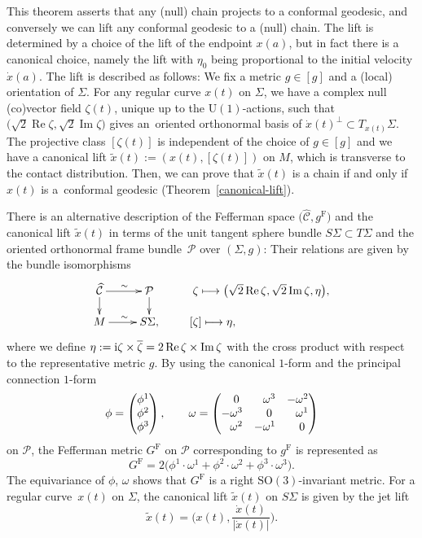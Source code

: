 \documentclass[pdftex]{sigma}
\newcommand\ol{\overline}
\newcommand{\wh}{\widehat}
\numberwithin{equation}{section}
\begin{document}
This theorem asserts that any (null) chain projects to a conformal geodesic, and conversely we can lift any conformal geodesic to a (null) chain. The lift is determined by a choice of the lift of the endpoint $x(a)$, but in fact there is a canonical choice, namely the lift with $\eta_0$ being proportional to the initial velocity $\dot x(a)$. The lift is described as follows:
We fix a metric $g\in[g]$ and a (local) orientation of $\Sigma$. For any regular curve $x(t)$ on $\Sigma$, we have a complex null (co)vector field $\zeta(t)$, unique up to the $\mathrm{U}(1)$-actions, such that $\bigl(\sqrt{2}\operatorname{Re}\zeta, \sqrt{2}\operatorname{Im}\zeta\bigr)$ gives an~oriented orthonormal basis of $\dot x(t)^\perp\subset T_{x(t)}\Sigma$. The projective class $[\zeta(t)]$ is independent of the choice of $g\in[g]$ and we have a canonical lift $\tilde x(t):=(x(t), [\zeta(t)])$ on $M$, which is transverse to the contact distribution. Then, we can prove that $\tilde x(t)$ is a chain if and only if $x(t)$ is a~conformal geodesic (Theorem~\ref{canonical-lift}).

There is an alternative description of the Fefferman space $\bigl(\wh{\mathcal{C}}, g^{\mathrm{F}}\bigr)$ and the canonical lift $\tilde x(t)$ in terms of the unit tangent sphere bundle $S\Sigma\subset T\Sigma$ and the oriented orthonormal frame bundle~$\mathcal{P}$ over $(\Sigma, g)$: Their relations are given by the bundle isomorphisms
\[
\xymatrix@R=10pt{
\wh{\mathcal{C}} \ar[r]^{\sim} \ar[d] & \mathcal{P} \ar[d] & \zeta \longmapsto \bigl(\sqrt{2}\operatorname{Re}\zeta, \sqrt{2}\operatorname{Im}\zeta, \eta\bigr), \\
M \ar[r]^{\sim} & S\Sigma, & \hspace{-3cm} [\zeta]\longmapsto \eta,
}
\]
where we define $\eta:={\rm i}\zeta\times \ol\zeta=2\operatorname{Re}\zeta\times \operatorname{Im}\zeta$ with the cross product with respect to the representative metric $g$.
By using the canonical $1$-form and the principal connection $1$-form
\[
\phi=\begin{pmatrix}
\phi^1 \\ \phi^2 \\ \phi^3
\end{pmatrix}
, \qquad \omega=\begin{pmatrix}
\hphantom{-}0 & \hphantom{-}\omega^3 & -\omega^2 \\
-\omega^3 & \hphantom{-}0 & \hphantom{-}\omega^1 \\
\hphantom{-}\omega^2 & -\omega^1 & \hphantom{-}0
\end{pmatrix}
\]
on $\mathcal{P}$, the Fefferman metric $G^{\mathrm{F}}$ on $\mathcal{P}$ corresponding to $g^{\mathrm{F}}$ is represented as
\[
G^{\mathrm{F}}=2\bigl( \phi^1\cdot\omega^1+ \phi^2\cdot\omega^2+ \phi^3\cdot\omega^3\bigr).
\]
The equivariance of $\phi$, $\omega$ shows that $G^{\mathrm{F}}$ is a right $\mathrm{SO}(3)$-invariant metric. For a regular curve~$x(t)$ on $\Sigma$, the canonical lift $\tilde x(t)$ on $S\Sigma$ is given by the jet lift
\begin{equation}\label{jet-lift}
\tilde x(t)=\biggl(x(t), \frac{\dot x(t)}{|\dot x(t)|}\biggr).
\end{equation}
\end{document}
